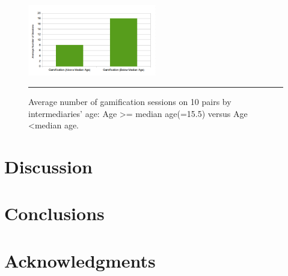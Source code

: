 \documentclass{sig-alternate}
\begin{document}
\begin{figure}[htbp]      
  \centering
    \includegraphics[width=0.5\textwidth]{gambyage_mod.png}
    \rule{26em}{0.5pt}
  \caption{Average number of gamification sessions on  10 pairs by intermediaries' age: Age \textgreater= median age(=15.5) versus Age \textless median age.}
  \label{figure:gambyage_mod}
\end{figure}\newline
\section{Discussion}
\section{Conclusions}


\section{Acknowledgments} 

%

%
%
\end{document}
